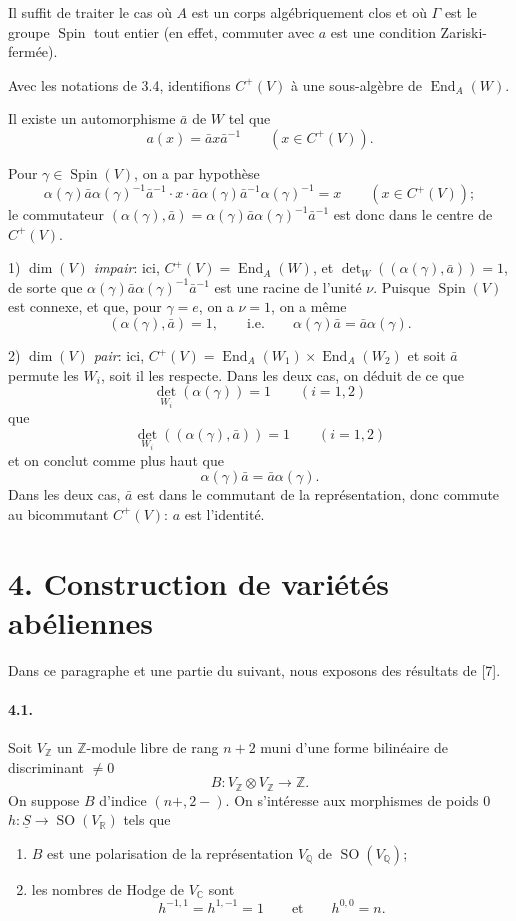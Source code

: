 \documentclass[10pt,leqno]{article}
\newcommand{\C}{\mathbb{C}}
\newcommand{\Q}{\mathbb{Q}}
\newcommand{\R}{\mathbb{R}}
\newcommand{\Z}{\mathbb{Z}}
\newcommand{\End}{\operatorname{End}}
\newcommand{\SO}{\operatorname{SO}}
\newcommand{\Spin}{\operatorname{Spin}}
\begin{document}
Il suffit de traiter le cas où $A$ est un corps algébriquement clos et où $\Gamma$ est le groupe $\Spin$ tout entier (en effet, commuter avec $a$ est une condition Zariski-fermée).

Avec les notations de 3.4, identifions $C^+(V)$ à une sous-algèbre de $\End_A(W)$.

Il existe un automorphisme $\bar a$ de $W$ tel que
\[
a(x)=\bar a x\bar a^{-1}\qquad(x\in C^+(V)).
\]

\clearpage

Pour $\gamma\in\Spin(V)$, on a par hypothèse
\[
\alpha(\gamma)\bar a\alpha(\gamma)^{-1}\bar a^{-1}\cdot x\cdot
\bar a\alpha(\gamma)\bar a^{-1}\alpha(\gamma)^{-1}=x
\qquad(x\in C^+(V));
\]
le commutateur $(\alpha(\gamma),\bar a)=\alpha(\gamma)\bar a\alpha(\gamma)^{-1}\bar a^{-1}$ est donc dans le centre de $C^+(V)$.

1) \emph{$\dim(V)$ impair}: ici, $C^+(V)=\End_A(W)$, et $\det_W((\alpha(\gamma),\bar a))=1$, de sorte que $\alpha(\gamma)\bar a\alpha(\gamma)^{-1}\bar a^{-1}$ est une racine de l'unité $\nu$. Puisque $\Spin(V)$ est connexe, et que, pour $\gamma=e$, on a $\nu=1$, on a même
\[
(\alpha(\gamma),\bar a)=1,
\qquad\text{i.e.}\qquad
\alpha(\gamma)\bar a=\bar a\alpha(\gamma).
\]

2) \emph{$\dim(V)$ pair}: ici, $C^+(V)=\End_A(W_1)\times\End_A(W_2)$ et soit $\bar a$ permute les $W_i$, soit il les respecte. Dans les deux cas, on déduit de ce que
\[
\det_{W_i}(\alpha(\gamma))=1\qquad(i=1,2)
\]
que
\[
\det_{W_i}((\alpha(\gamma),\bar a))=1\qquad(i=1,2)
\]
et on conclut comme plus haut que
\[
\alpha(\gamma)\bar a=\bar a\alpha(\gamma).
\]
Dans les deux cas, $\bar a$ est dans le commutant de la représentation, donc commute au bicommutant $C^+(V)$: $a$ est l'identité.

\section*{4. Construction de variétés abéliennes}

Dans ce paragraphe et une partie du suivant, nous exposons des résultats de [7].

\paragraph{4.1.} Soit $V_\Z$ un $\Z$-module libre de rang $n+2$ muni d'une forme bilinéaire de discriminant $\ne0$
\[
B:V_\Z\otimes V_\Z\longrightarrow\Z.
\]
On suppose $B$ d'indice $(n+,2-)$. On s'intéresse aux morphismes de poids $0$ $h:\underline S\to\SO(V_\R)$ tels que
\begin{enumerate}[label=\arabic*)]
\item $B$ est une polarisation de la représentation $V_\Q$ de $\SO(V_\Q)$;
\item les nombres de Hodge de $V_\C$ sont
\[
h^{-1,1}=h^{1,-1}=1\qquad\text{et}\qquad h^{0,0}=n.
\]
\end{enumerate}
\end{document}
